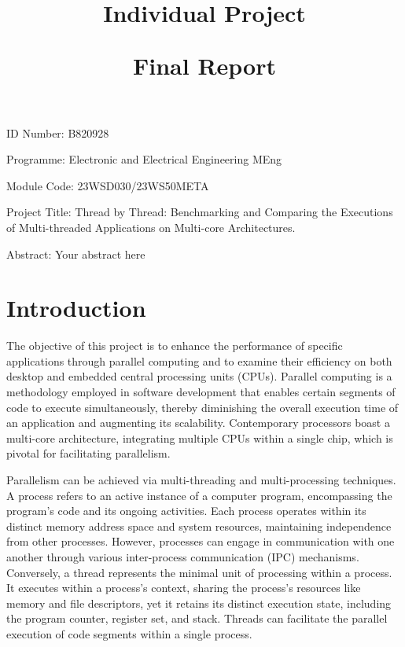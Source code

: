 \documentclass[12pt]{article}
\title{Individual Project

Final Report}
\author{}
\date{}
\begin{document}
\maketitle

ID Number: B820928

Programme: Electronic and Electrical Engineering MEng

Module Code: 23WSD030/23WS50META

Project Title: Thread by Thread: Benchmarking and Comparing the Executions of Multi-threaded Applications on Multi-core Architectures.

Abstract:
Your abstract here

\newpage
\tableofcontents
\newpage

\section{Introduction}
The objective of this project is to enhance the performance of specific applications through parallel computing and to examine their efficiency on both desktop and embedded central processing units (CPUs). Parallel computing is a methodology employed in software development that enables certain segments of code to execute simultaneously, thereby diminishing the overall execution time of an application and augmenting its scalability. Contemporary processors boast a multi-core architecture, integrating multiple CPUs within a single chip, which is pivotal for facilitating parallelism.  

Parallelism can be achieved via multi-threading and multi-processing techniques. A process refers to an active instance of a computer program, encompassing the program's code and its ongoing activities. Each process operates within its distinct memory address space and system resources, maintaining independence from other processes. However, processes can engage in communication with one another through various inter-process communication (IPC) mechanisms. Conversely, a thread represents the minimal unit of processing within a process. It executes within a process's context, sharing the process’s resources like memory and file descriptors, yet it retains its distinct execution state, including the program counter, register set, and stack. Threads can facilitate the parallel execution of code segments within a single process. 
\end{document}
